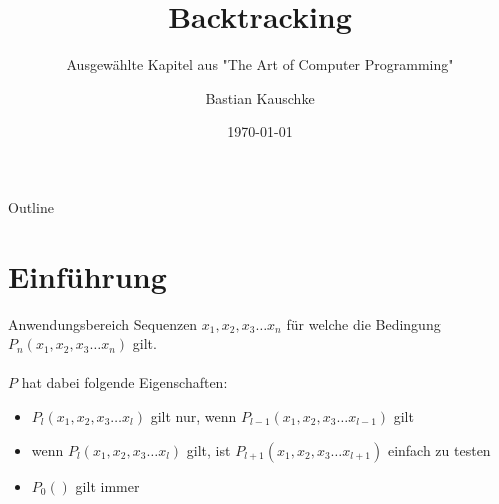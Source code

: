 \documentclass[aspectratio=43,t]{beamer}
\title[Backtracking]{Backtracking}
\subtitle{Ausgewählte Kapitel aus "The Art of Computer Programming"}
\author[Bastian Kauschke]{Bastian Kauschke}
\institute[Hardware-Software-Co-Design]{Hardware-Software-Co-Design, Friedrich-Alexander-Universität Erlangen-Nürnberg}
\date{\today}
\begin{document}
  \maketitle

  { %
    \begin{frame}[noframenumbering]{Outline}
      \tableofcontents
    \end{frame}
  }

  \section{Einführung}
  \begin{frame}{Anwendungsbereich}
    Sequenzen $x_{1}, x_{2}, x_{3} \dots x_{n}$ für welche die Bedingung $P_{n}(x_{1}, x_{2}, x_{3} \dots x_{n})$ gilt.\\
    \ \\ 
    $P$ hat dabei folgende Eigenschaften: \pause
    \begin{itemize}
      \item $P_{l}(x_{1}, x_{2}, x_{3} \dots x_{l})$ gilt nur, wenn $P_{l-1}(x_{1}, x_{2}, x_{3} \dots x_{l-1})$ gilt \pause
      \item wenn $P_{l}(x_{1}, x_{2}, x_{3} \dots x_{l})$ gilt, ist $P_{l+1}(x_{1}, x_{2}, x_{3} \dots x_{l+1})$ einfach zu testen \pause
      \item $P_{0}()$ gilt immer
    \end{itemize}
  \end{frame}
\end{document}
